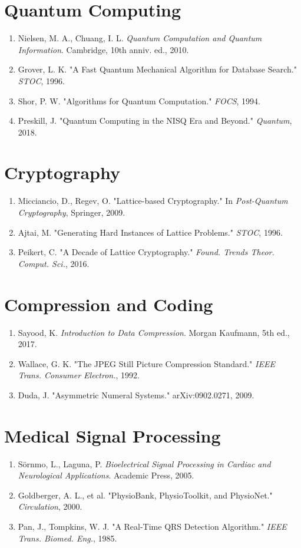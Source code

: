 \documentclass[11pt, a4paper, openany]{book}
\theoremstyle{definition}
\begin{document}
\section*{Quantum Computing}
\begin{enumerate}[resume]
    \item Nielsen, M. A., Chuang, I. L. \textit{Quantum Computation and Quantum Information}. Cambridge, 10th anniv. ed., 2010.
    \item Grover, L. K. "A Fast Quantum Mechanical Algorithm for Database Search." \textit{STOC}, 1996.
    \item Shor, P. W. "Algorithms for Quantum Computation." \textit{FOCS}, 1994.
    \item Preskill, J. "Quantum Computing in the NISQ Era and Beyond." \textit{Quantum}, 2018.
\end{enumerate}

\section*{Cryptography}
\begin{enumerate}[resume]
    \item Micciancio, D., Regev, O. "Lattice-based Cryptography." In \textit{Post-Quantum Cryptography}, Springer, 2009.
    \item Ajtai, M. "Generating Hard Instances of Lattice Problems." \textit{STOC}, 1996.
    \item Peikert, C. "A Decade of Lattice Cryptography." \textit{Found. Trends Theor. Comput. Sci.}, 2016.
\end{enumerate}

\section*{Compression and Coding}
\begin{enumerate}[resume]
    \item Sayood, K. \textit{Introduction to Data Compression}. Morgan Kaufmann, 5th ed., 2017.
    \item Wallace, G. K. "The JPEG Still Picture Compression Standard." \textit{IEEE Trans. Consumer Electron.}, 1992.
    \item Duda, J. "Asymmetric Numeral Systems." arXiv:0902.0271, 2009.
\end{enumerate}

\section*{Medical Signal Processing}
\begin{enumerate}[resume]
    \item Sörnmo, L., Laguna, P. \textit{Bioelectrical Signal Processing in Cardiac and Neurological Applications}. Academic Press, 2005.
    \item Goldberger, A. L., et al. "PhysioBank, PhysioToolkit, and PhysioNet." \textit{Circulation}, 2000.
    \item Pan, J., Tompkins, W. J. "A Real-Time QRS Detection Algorithm." \textit{IEEE Trans. Biomed. Eng.}, 1985.
\end{enumerate}
\end{document}
